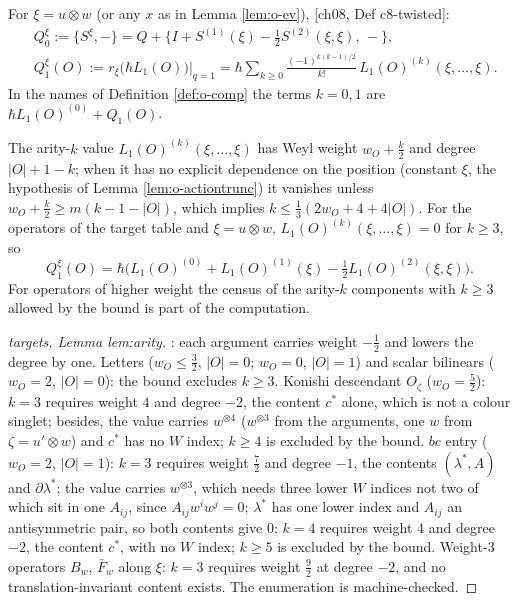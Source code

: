 \begin{definition}
\label{def:o-twisted}
For $\xi=u\otimes w$ (or any $x$ as in Lemma \ref{lem:o-ev}), [ch08, Def c8-twisted]:
\[
\begin{aligned}
&Q^\xi_0:=\{S^\xi,-\}=Q+\big\{I+S^{(1)}(\xi)-\tfrac12S^{(2)}(\xi,\xi),\,-\big\},\\
&Q^\xi_1(O):=r_\xi\big(\hbar L_1(O)\big)\big|_{q=1}=\hbar\sum_{k\ge0}\frac{(-1)^{k(k-1)/2}}{k!}\,L_1(O)^{(k)}(\xi,\dots,\xi).
\end{aligned}
\]
In the names of Definition \ref{def:o-comp} the terms $k=0,1$ are $\hbar L_1(O)^{(0)}+Q_1(O)$.
\end{definition}

\begin{proposition}
\label{prop:o-trunc}
The arity-$k$ value $L_1(O)^{(k)}(\xi,\dots,\xi)$ has Weyl weight $w_O+\tfrac k2$ and degree $|O|+1-k$; when it has no explicit dependence on the position (constant $\xi$, the hypothesis of Lemma \ref{lem:o-actiontrunc}) it vanishes unless $w_O+\tfrac k2\ge m(k-1-|O|)$, which implies $k\le\tfrac13(2w_O+4+4|O|)$. For the operators of the target table and $\xi=u\otimes w$, $L_1(O)^{(k)}(\xi,\dots,\xi)=0$ for $k\ge3$, so
\[
Q^\xi_1(O)=\hbar\Big(L_1(O)^{(0)}+L_1(O)^{(1)}(\xi)-\tfrac12L_1(O)^{(2)}(\xi,\xi)\Big).
\]
For operators of higher weight the census of the arity-$k$ components with $k\ge3$ allowed by the bound is part of the computation.
\end{proposition}

\begin{proof}
[targets, Lemma lem:arity]: each argument carries weight $-\tfrac12$ and lowers the degree by one. Letters ($w_O\le\tfrac32$, $|O|=0$; $w_O=0$, $|O|=1$) and scalar bilinears ($w_O=2$, $|O|=0$): the bound excludes $k\ge3$. Konishi descendant $O_\zeta$ ($w_O=\tfrac52$): $k=3$ requires weight $4$ and degree $-2$, the content $c^*$ alone, which is not a colour singlet; besides, the value carries $w^{\otimes4}$ ($w^{\otimes3}$ from the arguments, one $w$ from $\zeta=u'\otimes w$) and $c^*$ has no $W$ index; $k\ge4$ is excluded by the bound. $bc$ entry ($w_O=2$, $|O|=1$): $k=3$ requires weight $\tfrac72$ and degree $-1$, the contents $(\lambda^*,A)$ and $\partial\lambda^*$; the value carries $w^{\otimes3}$, which needs three lower $W$ indices not two of which sit in one $A_{ij}$, since $A_{ij}w^iw^j=0$; $\lambda^*$ has one lower index and $A_{ij}$ an antisymmetric pair, so both contents give $0$; $k=4$ requires weight $4$ and degree $-2$, the content $c^*$, with no $W$ index; $k\ge5$ is excluded by the bound. Weight-$3$ operators $B_w$, $\bar F_w$ along $\xi$: $k=3$ requires weight $\tfrac92$ at degree $-2$, and no translation-invariant content exists. The enumeration is machine-checked.
\end{proof}

